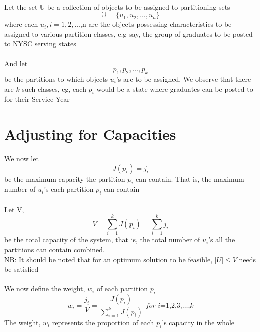 \documentclass[a4paper,openany]{book}
\begin{document}
			\paragraph{}Let the set $\mathbb{U}$ be a collection of objects to be assigned to partitioning sets
				\begin{equation}
					\mathbb{U} = \{u_1, u_2,\dots,u_n\}				
				\end{equation}
				where each $u_i, i=1,2,\dots$,n are the objects possessing characteristics to be assigned to various partition classes, e.g say, the group of graduates to be posted to NYSC serving states
			\paragraph{}And let
			\begin{equation}
				p_1,p_2,\dots,p_k
			\end{equation}
				be the partitions to which objects $u_i$'s are to be assigned. We observe that there are $k$ such classes, eg, each $p_i$ would be a state where graduates can be posted to for their Service Year
		\section{Adjusting for Capacities}
			\paragraph{}We now let
				\begin{equation}
					J(p_i) = j_i
				\end{equation}
				be the maximum capacity the partition $p_i$ can contain. That is, the maximum number of $u_i$'s each partition $p_i$ can contain
			\paragraph{}Let V,
				\begin{equation}
					V = \sum_{ i = 1 }^{k}{J(p_i)} = \sum_{i=1}^{k}{j_i}
				\end{equation}
				be the total capacity of the system, that is, the total number of $u_i$'s all the partitions can contain combined.\\
				NB: It should be noted that for an optimum solution to be feasible, $\mid U \mid \leq V$ needs be satisfied
			\paragraph{}We
				now define the weight, $w_i$ of each partition $p_i$
				\begin{equation}
					w_i = \frac{j_i}{V} = \frac{J(p_i)}{\sum_{i=1}^{k}{J(p_i)}}  \textit{ for i=1,2,3,}\dots\text{,}k
				\end{equation}
				The weight, $w_i$ represents the proportion of each $p_i$'s capacity in the whole
\end{document}
